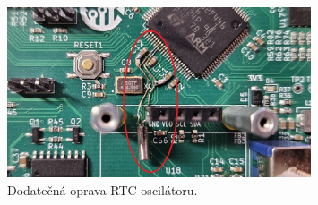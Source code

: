 \begin{figure}[h]
    \centering
    \includegraphics[width=0.8\textwidth]{obrazky/RTCcrystal}
    \caption{Dodatečná oprava RTC oscilátoru.}
    \label{fig:RTCcrystal}
\end{figure}






